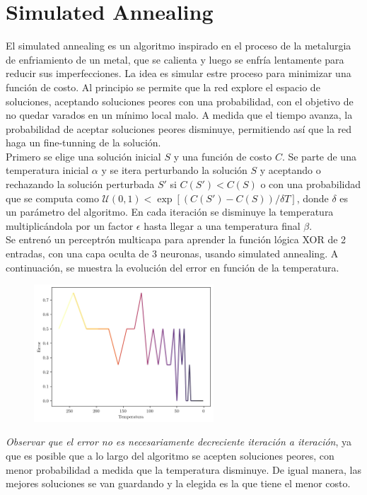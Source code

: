 \documentclass[12pt,a4paper]{article}
\begin{document}
\section{Simulated Annealing}
El simulated annealing es un algoritmo inspirado en el proceso de la metalurgia de enfriamiento de un metal, que se calienta y luego se enfría lentamente para reducir sus imperfecciones. La idea es simular estre proceso para minimizar una función de costo. Al principio se permite que la red explore el espacio de soluciones, aceptando soluciones peores con una probabilidad, con el objetivo de no quedar varados en un mínimo local malo. A medida que el tiempo avanza, la probabilidad de aceptar soluciones peores disminuye, permitiendo así que la red haga un fine-tunning de la solución.\\
Primero se elige una solución inicial $S$ y una función de costo $C$. Se parte de una temperatura inicial $\alpha$ y se itera perturbando la solución $S$ y aceptando o rechazando la solución perturbada $S'$ si $C(S') < C(S)$ o con una probabilidad que se computa como $\mathcal{U}(0, 1) < \exp[(C(S') - C(S))/\delta T]$, donde $\delta$ es un parámetro del algoritmo. En cada iteración se disminuye la temperatura multiplicándola por un factor $\epsilon$ hasta llegar a una temperatura final $\beta$.\\
Se entrenó un perceptrón multicapa para aprender la función lógica XOR de 2 entradas, con una capa oculta de 3 neuronas, usando simulated annealing. A continuación, se muestra la evolución del error en función de la temperatura.
\begin{figure}[H]
    \includegraphics[width=0.6\textwidth]{img/simulated_annealing-error_xor.png}
    \centering
\end{figure}
\textit{Observar que el error no es necesariamente decreciente iteración a iteración}, ya que es posible que a lo largo del algoritmo se acepten soluciones peores, con menor probabilidad a medida que la temperatura disminuye. De igual manera, las mejores soluciones se van guardando y la elegida es la que tiene el menor costo.
\end{document}
